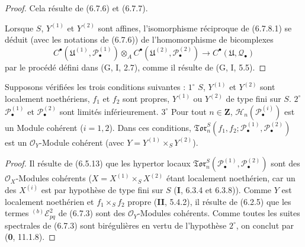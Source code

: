 \begin{proof}
Cela résulte de (6.7.6) et (6.7.7).

Lorsque $S$, $Y^{(1)}$ et $Y^{(2)}$ sont affines, l'isomorphisme réciproque de
(6.7.8.1) se déduit (avec les notations de (6.7.6)) de l'homomorphisme de
bicomplexes
\[
  C^\bullet(\mathfrak U^{(1)},\mathscr P_\bullet^{(1)})
  \otimes_A
  C^\bullet(\mathfrak U^{(2)},\mathscr P_\bullet^{(2)})
  \longrightarrow
  C^\bullet(\mathfrak U,\mathscr Q_\bullet)
\]
par le procédé défini dans (G, I, 2.7), comme il résulte de (G, I, 5.5).
\end{proof}

\begin{proposition}[6.7.9]
Supposons vérifiées les trois conditions suivantes : $1^\circ$ $S$,
$Y^{(1)}$ et $Y^{(2)}$ sont localement noethériens, $f_1$ et $f_2$ sont
propres, $Y^{(1)}$ ou $Y^{(2)}$ de type fini sur $S$. $2^\circ$
$\mathscr P_\bullet^{(1)}$ et $\mathscr P_\bullet^{(2)}$ sont limités
inférieurement. $3^\circ$ Pour tout $n\in\mathbf Z$,
$\mathscr H_n(\mathscr P_\bullet^{(i)})$ est un Module cohérent ($i=1,2$).
Dans ces conditions,
$\mathfrak{Tor}_n^S
(f_1,f_2;\mathscr P_\bullet^{(1)},\mathscr P_\bullet^{(2)})$ est un
$\mathscr O_Y$-Module cohérent (avec
$Y=Y^{(1)}\times_S Y^{(2)}$).
\end{proposition}

\begin{proof}
Il résulte de (6.5.13) que les hypertor locaux
$\mathfrak{Tor}_n^S(\mathscr P_\bullet^{(1)},\mathscr P_\bullet^{(2)})$ sont
des $\mathscr O_X$-Modules cohérents
($X=X^{(1)}\times_S X^{(2)}$ étant localement noethérien, car un des
$X^{(i)}$ est par hypothèse de type fini sur $S$ (\textbf{I}, 6.3.4 et 6.3.8)). Comme
$Y$ est localement noethérien et $f_1\times_S f_2$ propre (\textbf{II}, 5.4.2), il
résulte de (6.2.5) que les termes ${}^{(b)}\mathscr E_{pq}^2$ de (6.7.3) sont
des $\mathscr O_Y$-Modules cohérents. Comme toutes les suites spectrales de
(6.7.3) sont birégulières en vertu de l'hypothèse $2^\circ$, on conclut par
(\textbf{0}, 11.1.8).
\end{proof}

